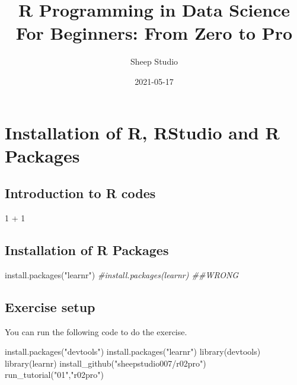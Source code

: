 \documentclass[
]{book}
\title{R Programming in Data Science For Beginners: From Zero to Pro}
\author{Sheep Studio}
\date{2021-05-17}
\newenvironment{Shaded}{\begin{snugshade}}{\end{snugshade}}
\newcommand{\CommentTok}[1]{\textcolor[rgb]{0.56,0.35,0.01}{\textit{#1}}}
\newcommand{\DecValTok}[1]{\textcolor[rgb]{0.00,0.00,0.81}{#1}}
\newcommand{\FunctionTok}[1]{\textcolor[rgb]{0.00,0.00,0.00}{#1}}
\newcommand{\NormalTok}[1]{#1}
\newcommand{\SpecialCharTok}[1]{\textcolor[rgb]{0.00,0.00,0.00}{#1}}
\newcommand{\StringTok}[1]{\textcolor[rgb]{0.31,0.60,0.02}{#1}}
\begin{document}
\maketitle

{
\setcounter{tocdepth}{1}
\tableofcontents
}
\hypertarget{installation-of-r-rstudio-and-r-packages}{%
\chapter{Installation of R, RStudio and R Packages}\label{installation-of-r-rstudio-and-r-packages}}

\hypertarget{introduction-to-r-codes}{%
\section{Introduction to R codes}\label{introduction-to-r-codes}}

\begin{Shaded}
\begin{Highlighting}[]
\DecValTok{1} \SpecialCharTok{+} \DecValTok{1}
\end{Highlighting}
\end{Shaded}

\hypertarget{installation-of-r-packages}{%
\section{Installation of R Packages}\label{installation-of-r-packages}}

\begin{Shaded}
\begin{Highlighting}[]
\FunctionTok{install.packages}\NormalTok{(}\StringTok{"learnr"}\NormalTok{)}
\CommentTok{\#install.packages(learnr) \#\#WRONG}
\end{Highlighting}
\end{Shaded}

\hypertarget{exercise-setup}{%
\section{Exercise setup}\label{exercise-setup}}

You can run the following code to do the exercise.

\begin{Shaded}
\begin{Highlighting}[]
\FunctionTok{install.packages}\NormalTok{(}\StringTok{"devtools"}\NormalTok{)}
\FunctionTok{install.packages}\NormalTok{(}\StringTok{"learnr"}\NormalTok{)}
\FunctionTok{library}\NormalTok{(devtools)}
\FunctionTok{library}\NormalTok{(learnr)}
\FunctionTok{install\_github}\NormalTok{(}\StringTok{"sheepstudio007/r02pro"}\NormalTok{)}
\FunctionTok{run\_tutorial}\NormalTok{(}\StringTok{"01"}\NormalTok{,}\StringTok{"r02pro"}\NormalTok{)}
\end{Highlighting}
\end{Shaded}
\end{document}
